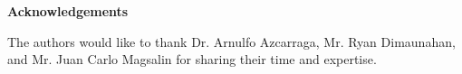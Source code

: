 %
%
%                 

\vspace*{\fill}
\begin{center}
	\textbf{Acknowledgements}

	The authors would like to thank Dr. Arnulfo Azcarraga, Mr. Ryan Dimaunahan, and Mr. Juan Carlo Magsalin for sharing their time and expertise. 
\end{center}
\vspace*{\fill}



